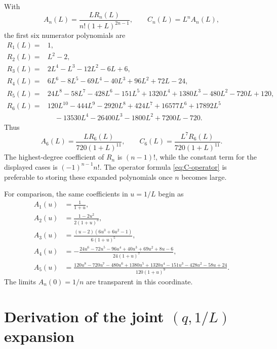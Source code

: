 \documentclass[11pt,a4paper]{article}
\numberwithin{equation}{section}
\theoremstyle{definition}
\theoremstyle{remark}
\newcommand{\Acoef}{A}
\newcommand{\Ccoef}{C}
\begin{document}
With
\begin{equation}\label{eq:appendix-An-shape}
  \Acoef_n(L)=\frac{L R_n(L)}{n!(1+L)^{2n-1}},
  \qquad
  \Ccoef_n(L)=L^n\Acoef_n(L),
\end{equation}
the first six numerator polynomials are
\begin{align*}
 R_1(L)={}&1,\\
 R_2(L)={}&L^2-2,\\
 R_3(L)={}&2L^4-L^3-12L^2-6L+6,\\
 R_4(L)={}&6L^6-8L^5-69L^4-40L^3+96L^2+72L-24,\\
 R_5(L)={}&24L^8-58L^7-428L^6-151L^5+1320L^4+1380L^3
            -480L^2-720L+120,\\
 R_6(L)={}&120L^{10}-444L^9-2920L^8+424L^7+16577L^6
            +17892L^5\\
          &\quad{}-13530L^4-26400L^3-1800L^2+7200L-720.
\end{align*}
Thus
\begin{equation}\label{eq:A6}
 \Acoef_6(L)=
 \frac{L R_6(L)}{720(1+L)^{11}},
 \qquad
 \Ccoef_6(L)=
 \frac{L^7 R_6(L)}{720(1+L)^{11}}.
\end{equation}
The highest-degree coefficient of \(R_n\) is \((n-1)!\), while the
constant term for the displayed cases is \((-1)^{n-1}n!\).  The operator
formula \eqref{eq:C-operator} is preferable to storing these expanded
polynomials once \(n\) becomes large.

For comparison, the same coefficients in \(u=1/L\) begin as
\begin{align*}
 A_1(u)&=\frac1{1+u},\\
 A_2(u)&=\frac{1-2u^2}{2(1+u)^3},\\
 A_3(u)&=\frac{(u-2)(6u^3+6u^2-1)}{6(1+u)^5},\\
 A_4(u)&=-\frac{24u^6-72u^5-96u^4+40u^3+69u^2+8u-6}
 {24(1+u)^7},\\
 A_5(u)&=\frac{120u^8-720u^7-480u^6+1380u^5+1320u^4
 -151u^3-428u^2-58u+24}
 {120(1+u)^9}.
\end{align*}
The limits \(A_n(0)=1/n\) are transparent in this coordinate.

\section[Derivation of the joint (q,1/L) expansion]{Derivation of the joint \((q,1/L)\) expansion}
\end{document}
